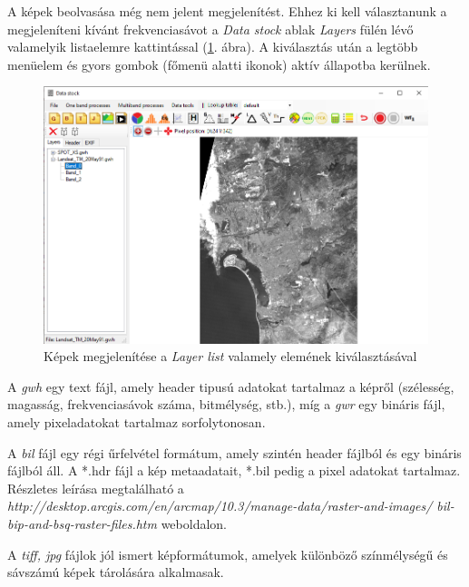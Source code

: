 \documentclass[a4paper,12pt]{article}
\begin{document}
 A képek beolvasása még nem jelent megjelenítést. Ehhez ki kell választanunk a megjeleníteni kívánt frekvenciasávot a \textit{Data stock} ablak \textit{Layers} fülén lévő valamelyik listaelemre kattintással (\ref{fig:layer_list}. ábra). A kiválasztás után a legtöbb menüelem és gyors gombok (főmenü alatti ikonok) aktív állapotba kerülnek.
 
\begin{figure}
	\centering
	\includegraphics[width=14cm]{layer_list.png}
	\caption{Képek megjelenítése a \textit{Layer list} valamely elemének kiválasztásával}
	\label{fig:layer_list}
\end{figure} 
	
A \textit{gwh} egy text fájl, amely header tipusú adatokat tartalmaz a képről (szélesség, magasság, frekvenciasávok száma, bitmélység, stb.), míg a \textit{gwr} egy bináris fájl, amely pixeladatokat tartalmaz sorfolytonosan. 

A \textit{bil} fájl egy régi űrfelvétel formátum, amely szintén header fájlból és egy bináris fájlból áll. A *.hdr fájl a kép metaadatait, *.bil pedig a pixel adatokat tartalmaz. Részletes leírása megtalálható a \newline \textit{http://desktop.arcgis.com/en/arcmap/10.3/manage-data/raster-and-images/ bil-bip-and-bsq-raster-files.htm} weboldalon. 

A \textit{tiff, jpg} fájlok jól ismert képformátumok, amelyek különböző színmélységű és sávszámú képek tárolására alkalmasak.
\end{document}
